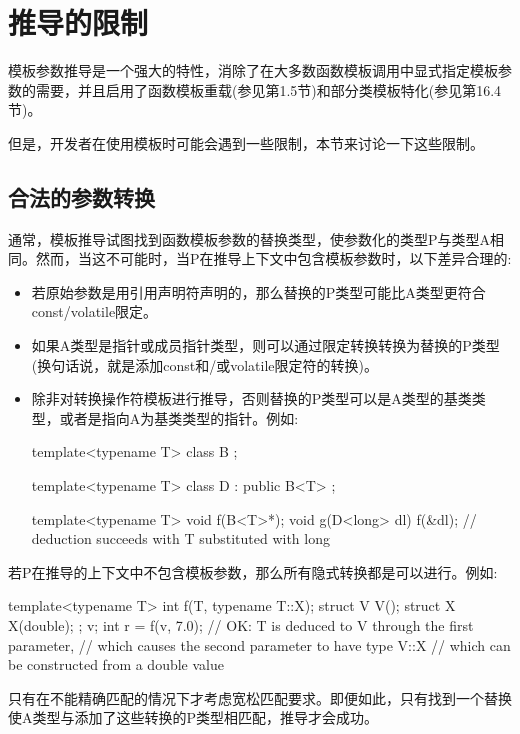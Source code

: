 \section{推导的限制}


模板参数推导是一个强大的特性，消除了在大多数函数模板调用中显式指定模板参数的需要，并且启用了函数模板重载(参见第1.5节)和部分类模板特化(参见第16.4节)。

但是，开发者在使用模板时可能会遇到一些限制，本节来讨论一下这些限制。

\subsection{合法的参数转换}

通常，模板推导试图找到函数模板参数的替换类型，使参数化的类型P与类型A相同。然而，当这不可能时，当P在推导上下文中包含模板参数时，以下差异合理的:

\begin{itemize}
\item 
若原始参数是用引用声明符声明的，那么替换的P类型可能比A类型更符合const/volatile限定。

\item 
如果A类型是指针或成员指针类型，则可以通过限定转换转换为替换的P类型(换句话说，就是添加const和/或volatile限定符的转换)。

\item 
除非对转换操作符模板进行推导，否则替换的P类型可以是A类型的基类类型，或者是指向A为基类类型的指针。例如:

\begin{cpp}
template<typename T>
class B {
};

template<typename T>
class D : public B<T> {
};

template<typename T> void f(B<T>*);
void g(D<long> dl)
{
	f(&dl); // deduction succeeds with T substituted with long
}
\end{cpp}
\end{itemize}

若P在推导的上下文中不包含模板参数，那么所有隐式转换都是可以进行。例如:

\begin{cpp}
template<typename T> int f(T, typename T::X);
struct V {
	V();
	struct X {
		X(double);
	};
} v;
int r = f(v, 7.0); // OK: T is deduced to V through the first parameter,
					// which causes the second parameter to have type V::X
					// which can be constructed from a double value
\end{cpp}

只有在不能精确匹配的情况下才考虑宽松匹配要求。即便如此，只有找到一个替换使A类型与添加了这些转换的P类型相匹配，推导才会成功。

